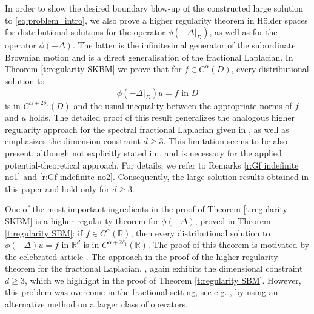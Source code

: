 \documentclass[12pt,a4paper,onecolumn]{amsart}
\theoremstyle{definition}
\newcommand{\R}{\mathbb{R}}
\newcommand{\1}{\mathbf 1}
\newcommand{\Lo}{\phi(-\left.\Delta\right\vert_{D})}
\newcommand{\LoR}{\phi(-\Delta)}
\numberwithin{equation}{section}
\begin{document}
In order to show the desired boundary blow-up of the constructed large solution to \eqref{eq:problem_intro}, we also prove a higher regularity theorem in H\"older spaces for distributional solutions for the operator $\Lo$, as well as for the operator $\LoR$. The latter is the infinitesimal generator of the subordinate Brownian motion and is a direct generalisation of the fractional Laplacian. In Theorem \ref{t:regularity SKBM} we prove that for $f\in C^\alpha(D)$, every distributional solution to 
\[
\Lo u=f\text{ in } D
\]
is in $C^{\alpha+2\delta_1}(D)$ and the usual inequality between the appropriate norms of $f$ and $u$ holds. The detailed proof of this result generalizes the analogous higher regularity approach for the spectral fractional Laplacian given in \cite[Lemma 21]{AbaDupaNonhomo2017}, as well as emphasizes the dimension constraint $d\ge 3$. This limitation seems to be also present, although not explicitly stated in \cite{AbaDupaNonhomo2017,Silvestre2007regularity}, and is necessary for the applied potential-theoretical approach. For details, we refer to Remarks \ref{r:Gf indefinite no1} and \ref{r:Gf indefinite no2}. Consequently, the large solution results obtained in this paper and \cite{AbaDupaNonhomo2017} hold only for $d\ge3$. 


 


One of the most important ingredients in the proof of Theorem \ref{t:regularity SKBM} is a higher regularity theorem for $\LoR$, proved in Theorem \ref{t:regularity SBM}: if $f\in C^\alpha(\R)$, then every distributional solution to $\LoR u=f$ in $\R^d$ is in $C^{\alpha+2\delta_1}(\R)$. The proof of this theorem is motivated by the celebrated article \cite{Silvestre2007regularity}. The approach in the proof of the higher regularity theorem for the fractional Laplacian, \cite[Proposition 2.8]{Silvestre2007regularity}, again exhibits the dimensional constraint $d\ge 3$, which we highlight in the proof of Theorem \ref{t:regularity SBM}. However, this problem was overcome in the fractional setting, see e.g. \cite{Ros-OtonSerra2016}, by using an alternative method on a larger class of operators.
\end{document}
